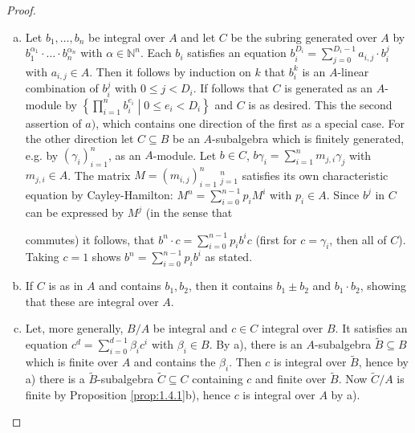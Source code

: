 \documentclass[DIV=14,parskip=half]{scrartcl}
\newenvironment{alphanumerate}{\begin{enumerate}[a)]}{\end{enumerate}}
\theoremstyle{definition}
\newcommand{\N}{\mathbb{N}}
\newcommand{\ldotspam}{,\ldots,}
\begin{document}
\begin{proof}
 \begin{alphanumerate}
  \item Let $b_1\ldotspam b_n$ be integral over $A$ and let $C$ be the subring generated over $A$ by $b_1^{\alpha_1}\cdot\ldots\cdot b_n^{\alpha_n}$ with $\alpha\in \N^n$. Each $b_i$ satisfies an equation $b_i^{D_i} = \sum_{j=0}^{D_i-1} a_{i,j}\cdot b_i^j$ with $a_{i,j}\in A$. Then it follows by induction on $k$ that $b_i^k$ is an $A$-linear combination of $b_i^j$ with $0\leq j < D_i$. If follows that $C$ is generated as an $A$-module by $\left\{\prod_{i=1}^n b_i^{e_i}\middle| 0\leq e_i< D_i\right\}$ and $C$ is as desired. This the second assertion of $a)$, which contains one direction of the first as a special case. For the other direction let $C\subseteq B$ be an $A$-subalgebra which is finitely generated, e.g. by $(\gamma_i)_{i=1}^n$, as an $A$-module. Let $b\in C$, $b\gamma_i=\sum_{i=1}^n m_{j,i} \gamma_j$ with $m_{j,i}\in A$. The matrix $M=(m_{i,j})_{i=1}^n\ _{j=1}^n$ satisfies its own characteristic equation by Cayley-Hamilton: $M^n = \sum_{i=0}^{n-1}p_i M^i$ with $p_i\in A$. Since $b^j$ in $C$ can be expressed by $M^j$ (in the sense that 
  \begin{center}
  \end{center}
  commutes) it follows, that $b^n \cdot c = \sum_{i=0}^{n-1} p_ib^ic$ (first for $c=\gamma_i$, then all of $C$). Taking $c=1$ shows $b^n = \sum_{i=0}^{n-1}p_i b^i$ as stated.
  \item If $C$ is as in $A$ and contains $b_1, b_2$, then it contains $b_1\pm b_2$ and $b_1\cdot b_2$, showing that these are integral over $A$. 
  \item Let, more generally, $B/A$ be integral and $c\in C$ integral over $B$. It satisfies an equation $c^d = \sum_{i=0}^{d-1} \beta_i c^i$ with $\beta_i\in B$. By a), there is an $A$-subalgebra $\tilde B\subseteq B$ which is finite over $A$ and contains the $\beta_i$. Then $c$ is integral over $\tilde B$, hence by a) there is a $\tilde B$-subalgebra $\tilde C\subseteq C$ containing $c$ and finite over $\tilde B$. Now $\tilde C/A$ is finite by Proposition \ref{prop:1.4.1}b), hence $c$ is integral over $A$ by a).
 \end{alphanumerate}


\end{proof}
\end{document}
